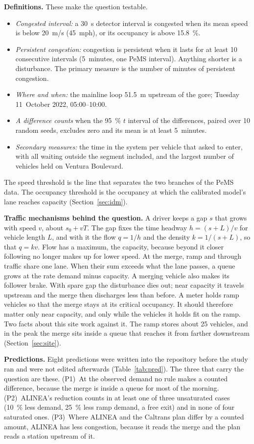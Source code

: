 \documentclass[11pt,letterpaper]{article}
\begin{document}
\textbf{Definitions.} These make the question testable.
\begin{itemize}
\item \emph{Congested interval:} a 30~s detector interval is congested when its mean
  speed is below 20~m/s (45~mph), or its occupancy is above 15.8~\%.
\item \emph{Persistent congestion:} congestion is persistent when it lasts for at least
  10 consecutive intervals (5~minutes, one PeMS interval). Anything shorter is a
  disturbance. The primary measure is the number of minutes of persistent congestion.
\item \emph{Where and when:} the mainline loop 51.5~m upstream of the gore; Tuesday
  11~October 2022, 05:00--10:00.
\item \emph{A difference counts} when the 95~\% $t$ interval of the differences, paired
  over 10 random seeds, excludes zero and its mean is at least 5~minutes.
\item \emph{Secondary measures:} the time in the system per vehicle that asked to enter,
  with all waiting outside the segment included, and the largest number of vehicles held
  on Ventura Boulevard.
\end{itemize}
The speed threshold is the line that separates the two branches of the PeMS data. The
occupancy threshold is the occupancy at which the calibrated model's lane reaches
capacity (Section~\ref{sec:idm}).

\textbf{Traffic mechanisms behind the question.} A driver keeps a gap $s$ that grows
with speed $v$, about $s_0+vT$. The gap fixes the time headway $h=(s+L)/v$ for vehicle
length $L$, and with it the flow $q=1/h$ and the density $k=1/(s+L)$, so that $q=kv$.
Flow has a maximum, the capacity, because beyond it closer following no longer makes up
for lower speed. At the merge, ramp and through traffic share one lane. When their sum
exceeds what the lane passes, a queue grows at the rate demand minus capacity. A merging
vehicle also makes its follower brake. With spare gap the disturbance dies out; near
capacity it travels upstream and the merge then discharges less than before. A meter
holds ramp vehicles so that the merge stays at its critical occupancy. It should
therefore matter only near capacity, and only while the vehicles it holds fit on the
ramp. Two facts about this site work against it. The ramp stores about 25 vehicles, and
in the peak the merge sits inside a queue that reaches it from farther downstream
(Section~\ref{sec:site}).

\textbf{Predictions.} Eight predictions were written into the repository before the
study ran and were not edited afterwards (Table~\ref{tab:pred}). The three that carry the
question are these. (P1)~At the observed demand no rule makes a counted difference,
because the merge is inside a queue for most of the morning. (P2)~ALINEA's reduction
counts in at least one of three unsaturated cases (10~\% less demand, 25~\% less ramp
demand, a free exit) and in none of four saturated ones. (P3)~Where ALINEA and the
Caltrans plan differ by a counted amount, ALINEA has less congestion, because it reads
the merge and the plan reads a station upstream of it.
\end{document}
